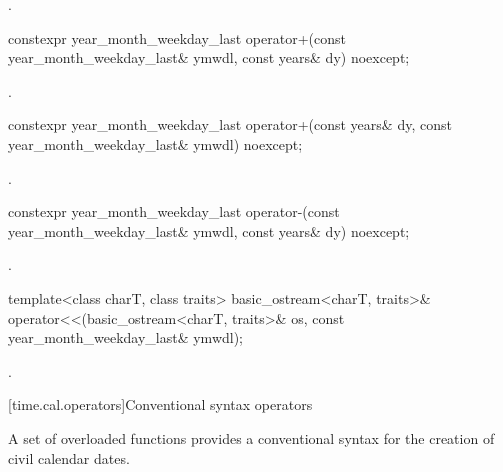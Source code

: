 \begin{itemdescr}
\pnum
\returns {}.
\end{itemdescr}

%
\begin{itemdecl}
constexpr year_month_weekday_last
  operator+(const year_month_weekday_last& ymwdl, const years& dy) noexcept;
\end{itemdecl}

\begin{itemdescr}
\pnum
\returns {}.
\end{itemdescr}

%
\begin{itemdecl}
constexpr year_month_weekday_last
  operator+(const years& dy, const year_month_weekday_last& ymwdl) noexcept;
\end{itemdecl}

\begin{itemdescr}
\pnum
\returns {}.
\end{itemdescr}

%
\begin{itemdecl}
constexpr year_month_weekday_last
  operator-(const year_month_weekday_last& ymwdl, const years& dy) noexcept;
\end{itemdecl}

\begin{itemdescr}
\pnum
\returns {}.
\end{itemdescr}

%
\begin{itemdecl}
template<class charT, class traits>
  basic_ostream<charT, traits>&
    operator<<(basic_ostream<charT, traits>& os, const year_month_weekday_last& ymwdl);
\end{itemdecl}

\begin{itemdescr}
\pnum
\returns {}.
\end{itemdescr}

[time.cal.operators]{Conventional syntax operators}

\pnum
A set of overloaded  functions provides
a conventional syntax for the creation of civil calendar dates.

